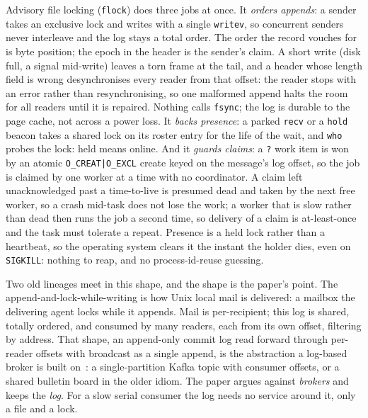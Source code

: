 \documentclass[11pt]{article}
\newcommand{\code}[1]{\texttt{#1}}
\begin{document}
Advisory file locking (\code{flock}) does three jobs at once. It \emph{orders appends}: a sender takes an exclusive lock and writes with a single \code{writev}, so concurrent senders never interleave and the log stays a total order. The order the record vouches for is byte position; the epoch in the header is the sender's claim. A short write (disk full, a signal mid-write) leaves a torn frame at the tail, and a header whose length field is wrong desynchronises every reader from that offset: the reader stops with an error rather than resynchronising, so one malformed append halts the room for all readers until it is repaired. Nothing calls \code{fsync}; the log is durable to the page cache, not across a power loss. It \emph{backs presence}: a parked \code{recv} or a \code{hold} beacon takes a shared lock on its roster entry for the life of the wait, and \code{who} probes the lock: held means online. And it \emph{guards claims}: a \code{?} work item is won by an atomic \code{O\_CREAT|O\_EXCL} create keyed on the message's log offset, so the job is claimed by one worker at a time with no coordinator. A claim left unacknowledged past a time-to-live is presumed dead and taken by the next free worker, so a crash mid-task does not lose the work; a worker that is slow rather than dead then runs the job a second time, so delivery of a claim is at-least-once and the task must tolerate a repeat. Presence is a held lock rather than a heartbeat, so the operating system clears it the instant the holder dies, even on \code{SIGKILL}: nothing to reap, and no process-id-reuse guessing.

Two old lineages meet in this shape, and the shape is the paper's point. The append-and-lock-while-writing is how Unix local mail is delivered: a mailbox the delivering agent locks while it appends. Mail is per-recipient; this log is shared, totally ordered, and consumed by many readers, each from its own offset, filtering by address. That shape, an append-only commit log read forward through per-reader offsets with broadcast as a single append, is the abstraction a log-based broker is built on~\cite{kreps}: a single-partition Kafka topic with consumer offsets, or a shared bulletin board in the older idiom. The paper argues against \emph{brokers} and keeps the \emph{log}. For a slow serial consumer the log needs no service around it, only a file and a lock.
\end{document}

